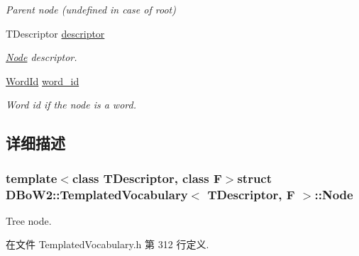\begin{DoxyCompactItemize}
\begin{DoxyCompactList}\small\item\em Parent node (undefined in case of root) \end{DoxyCompactList}\item 
\hypertarget{structDBoW2_1_1TemplatedVocabulary_1_1Node_ab785e994eeae8e6c1d67ee45ad4c8450}{T\-Descriptor \hyperlink{structDBoW2_1_1TemplatedVocabulary_1_1Node_ab785e994eeae8e6c1d67ee45ad4c8450}{descriptor}}\label{structDBoW2_1_1TemplatedVocabulary_1_1Node_ab785e994eeae8e6c1d67ee45ad4c8450}

\begin{DoxyCompactList}\small\item\em \hyperlink{structDBoW2_1_1TemplatedVocabulary_1_1Node}{Node} descriptor. \end{DoxyCompactList}\item 
\hypertarget{structDBoW2_1_1TemplatedVocabulary_1_1Node_aa56418d848932be4583fac6b3021c708}{\hyperlink{namespaceDBoW2_ab1a0d3283b2d4690a383372ed20bfeb5}{Word\-Id} \hyperlink{structDBoW2_1_1TemplatedVocabulary_1_1Node_aa56418d848932be4583fac6b3021c708}{word\-\_\-id}}\label{structDBoW2_1_1TemplatedVocabulary_1_1Node_aa56418d848932be4583fac6b3021c708}

\begin{DoxyCompactList}\small\item\em Word id if the node is a word. \end{DoxyCompactList}\end{DoxyCompactItemize}


\subsection{详细描述}
\subsubsection*{template$<$class T\-Descriptor, class F$>$struct D\-Bo\-W2\-::\-Templated\-Vocabulary$<$ T\-Descriptor, F $>$\-::\-Node}

Tree node. 

在文件 Templated\-Vocabulary.\-h 第 312 行定义.



